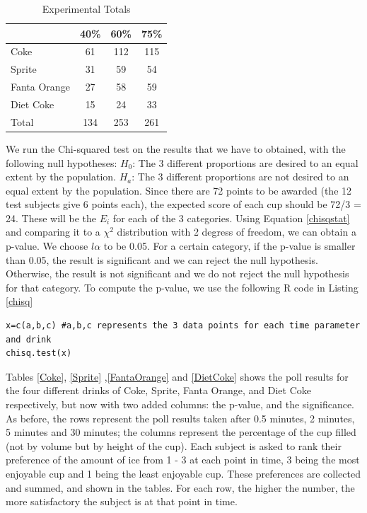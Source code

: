 \documentclass[oneside,12pt]{report}
\begin{document}
\begin{table}[ h] 
\centering
\begin{tabular}{ l || c|c|c }
  &40\% &60\% & 75\%  \\
\hline  
Coke & 61 & 112 & 115 \\
\hline  
Sprite & 31& 59 & 54 \\
\hline  
Fanta Orange & 27 & 58 & 59 \\ 
\hline  
Diet Coke & 15 & 24& 33 \\ 
\hline  
Total & 134 & 253 & 261  \\ 
\hline     
 \end{tabular}
\caption{Experimental Totals}
\label{ExpTotal}
\end{table}

\newpage

We run the Chi-squared test on the results that we have to obtained, with the following null hypotheses:
\vskip6pt $H_0$: The 3 different proportions are desired to an equal extent by the population.
\vskip3pt $H_a$: The 3 different proportions are not desired to an equal extent by the population.
\vskip6pt
\vspace{12pt}
Since there are 72 points to be awarded (the 12 test subjects give 6 points each), the expected score of each cup should be 72/3 = 24. These will be the $E_i$ for each of the 3 categories. Using Equation \eqref{chisqstat} and comparing it to a $\chi^2$ distribution with 2 degress of freedom, we can obtain a p-value. We choose $l\alpha$ to be 0.05. For a certain category, if the p-value is smaller than 0.05, the result is significant and we can reject the null hypothesis. Otherwise, the result is not significant and we do not reject the null hypothesis for that category.
\vspace{12pt}
\newline
To compute the p-value, we use the following R code in Listing \ref{chisq}
\begin{lstlisting}[caption= R code for chi-squared test, label=chisq]
x=c(a,b,c) #a,b,c represents the 3 data points for each time parameter and drink
chisq.test(x)
\end{lstlisting}
\vspace{12pt}
Tables \ref{Coke}, \ref{Sprite} ,\ref{FantaOrange} and \ref{DietCoke} shows the poll results for the four different drinks of Coke, Sprite, Fanta Orange, and Diet Coke respectively, but now with two added columns: the p-value, and the significance. As before, the rows represent the poll results taken after 0.5 minutes, 2 minutes, 5 minutes and 30 minutes; the columns represent the percentage of the cup filled (not by volume but by height of the cup). Each subject is asked to rank their preference of the amount of ice from 1 - 3 at each point in time, 3 being the most enjoyable cup and 1 being the least enjoyable cup. These preferences are collected and summed, and shown in the tables. For each row, the higher the number, the more satisfactory the subject is at that point in time. 
\end{document}
